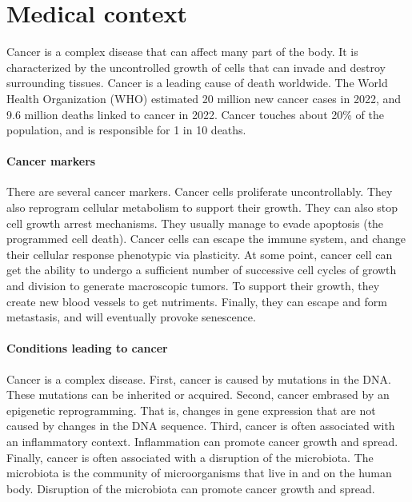 \section{Medical context}

Cancer is a complex disease that can affect many part of the body.
It is characterized by the uncontrolled growth of cells that can invade and destroy surrounding tissues.
Cancer is a leading cause of death worldwide.
The World Health Organization (WHO) estimated 20 million new cancer cases in 2022, and 9.6 million deaths linked to cancer in 2022\cite{who_cancer2022}.
Cancer touches about 20\% of the population, and is responsible for 1 in 10 deaths.

\paragraph{Cancer markers}
There are several cancer markers.
Cancer cells proliferate uncontrollably.
They also reprogram cellular metabolism to support their growth.
They can also stop cell growth arrest mechanisms.
They usually manage to evade apoptosis (the programmed cell death).
Cancer cells can escape the immune system, and change their cellular response phenotypic via plasticity.
At some point, cancer cell can get the ability to undergo a sufficient number of successive cell cycles of growth and division to generate macroscopic tumors.
To support their growth, they create new blood vessels to get nutriments.
Finally, they can escape and form metastasis, and will eventually provoke senescence.

\paragraph{Conditions leading to cancer}
Cancer is a complex disease.
First, cancer is caused by mutations in the DNA.
These mutations can be inherited or acquired.
Second, cancer embrased by an epigenetic reprogramming.
That is, changes in gene expression that are not caused by changes in the DNA sequence.
Third, cancer is often associated with an inflammatory context.
Inflammation can promote cancer growth and spread.
Finally, cancer is often associated with a disruption of the microbiota.
The microbiota is the community of microorganisms that live in and on the human body.
Disruption of the microbiota can promote cancer growth and spread.

